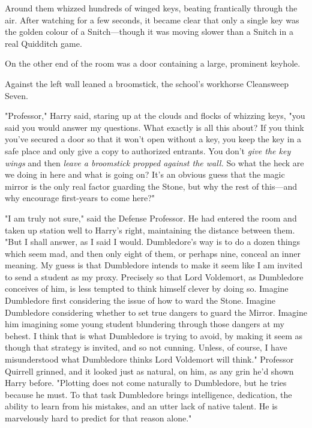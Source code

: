 Around them whizzed hundreds of winged keys, beating frantically through the
air. After watching for a few seconds, it became clear that only a single key
was the golden colour of a Snitch---though it was moving slower than a Snitch in
a real Quidditch game.

On the other end of the room was a door containing a large, prominent keyhole.

Against the left wall leaned a broomstick, the school's workhorse Cleansweep
Seven.

"Professor," Harry said, staring up at the clouds and flocks of whizzing keys,
"you said you would answer my questions. What exactly is all this about? If you
think you've secured a door so that it won't open without a key, you keep the
key in a safe place and only give a copy to authorized entrants. You don't
\emph{give the key wings} and then \emph{leave a broomstick propped against the
wall.} So what the heck are we doing in here and what is going on? It's an
obvious guess that the magic mirror is the only real factor guarding the Stone,
but why the rest of this---and why encourage first-years to come here?"

"I am truly not sure," said the Defense Professor. He had entered the room and
taken up station well to Harry's right, maintaining the distance between them.
"But I shall answer, as I said I would. Dumbledore's way is to do a dozen
things which seem mad, and then only eight of them, or perhaps nine, conceal an
inner meaning. My guess is that Dumbledore intends to make it seem like I am
invited to send a student as my proxy. Precisely so that Lord Voldemort, as
Dumbledore conceives of him, is less tempted to think himself clever by doing
so. Imagine Dumbledore first considering the issue of how to ward the Stone.
Imagine Dumbledore considering whether to set true dangers to guard the Mirror.
Imagine him imagining some young student blundering through those dangers at my
behest. I think that is what Dumbledore is trying to avoid, by making it seem
as though that strategy is invited, and so not cunning. Unless, of course, I
have misunderstood what Dumbledore thinks Lord Voldemort will think." Professor
Quirrell grinned, and it looked just as natural, on him, as any grin he'd shown
Harry before. "Plotting does not come naturally to Dumbledore, but he tries
because he must. To that task Dumbledore brings intelligence, dedication, the
ability to learn from his mistakes, and an utter lack of native talent. He is
marvelously hard to predict for that reason alone."

